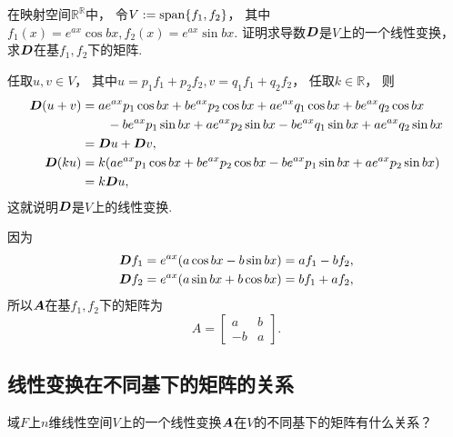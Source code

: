 \begin{example}
在映射空间\(\mathbb{R}^\mathbb{R}\)中，
令\(V := \operatorname{span}\{f_1,f_2\}\)，
其中\(f_1(x) = e^{ax} \cos bx,
f_2(x) = e^{ax} \sin bx\).
证明求导数\(\boldsymbol{D}\)是\(V\)上的一个线性变换，
求\(\boldsymbol{D}\)在基\(f_1,f_2\)下的矩阵.
\begin{solution}
任取\(u,v \in V\)，
其中\(u = p_1 f_1 + p_2 f_2,
v = q_1 f_1 + q_2 f_2\)，
任取\(k \in \mathbb{R}\)，
则\begin{align*}
	\boldsymbol{D}(u + v)
	&= a e^{a x} p_1 \cos b x
		+ b e^{a x} p_2 \cos b x
		+ a e^{a x} q_1 \cos b x
		+ b e^{a x} q_2 \cos b x \\
	&\hspace{20pt}
		- b e^{a x} p_1 \sin b x
		+ a e^{a x} p_2 \sin b x
		- b e^{a x} q_1 \sin b x
		+ a e^{a x} q_2 \sin b x \\
	&= \boldsymbol{D}u + \boldsymbol{D}v, \\
	\boldsymbol{D}(k u)
	&= k (a e^{a x} p_1 \cos b x + b e^{a x} p_2 \cos b x -
		b e^{a x} p_1 \sin b x + a e^{a x} p_2 \sin b x) \\
	&= k \boldsymbol{D}u,
\end{align*}
这就说明\(\boldsymbol{D}\)是\(V\)上的线性变换.

因为\begin{gather*}
	\boldsymbol{D}f_1 = e^{ax} (a \cos bx - b \sin bx)
	= a f_1 - b f_2, \\
	\boldsymbol{D}f_2 = e^{ax} (a \sin bx + b \cos bx)
	= b f_1 + a f_2,
\end{gather*}
所以\(\boldsymbol{A}\)在基\(f_1,f_2\)下的矩阵为\begin{equation*}
	A = \begin{bmatrix}
		a & b \\
		-b & a
	\end{bmatrix}.
\end{equation*}
\end{solution}
\end{example}

\subsection{线性变换在不同基下的矩阵的关系}
域\(F\)上\(n\)维线性空间\(V\)上的一个线性变换\(\boldsymbol{A}\)在\(V\)的不同基下的矩阵有什么关系？

